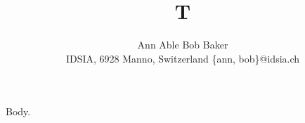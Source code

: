 \documentclass{article}
\begin{document}
\title{T}
\author{Ann Able \quad Bob Baker\\
\small{IDSIA, 6928 Manno, Switzerland}
{\{ann, bob\}@idsia.ch}}
\maketitle
Body.
\end{document}

